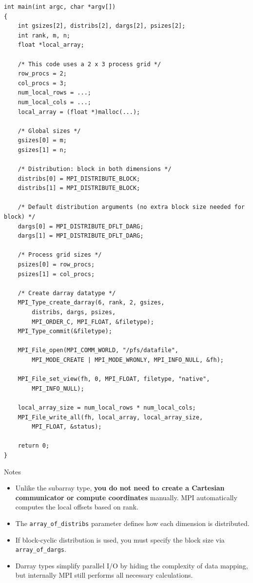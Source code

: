 \documentclass[12pt]{book}
\begin{document}
\begin{lstlisting}[style=cppstyle]
int main(int argc, char *argv[])
{
    int gsizes[2], distribs[2], dargs[2], psizes[2];
    int rank, m, n;
    float *local_array;

    /* This code uses a 2 x 3 process grid */
    row_procs = 2;
    col_procs = 3;
    num_local_rows = ...;
    num_local_cols = ...;
    local_array = (float *)malloc(...);

    /* Global sizes */
    gsizes[0] = m;
    gsizes[1] = n;

    /* Distribution: block in both dimensions */
    distribs[0] = MPI_DISTRIBUTE_BLOCK;
    distribs[1] = MPI_DISTRIBUTE_BLOCK;

    /* Default distribution arguments (no extra block size needed for block) */
    dargs[0] = MPI_DISTRIBUTE_DFLT_DARG;
    dargs[1] = MPI_DISTRIBUTE_DFLT_DARG;

    /* Process grid sizes */
    psizes[0] = row_procs;
    psizes[1] = col_procs;

    /* Create darray datatype */
    MPI_Type_create_darray(6, rank, 2, gsizes,
        distribs, dargs, psizes,
        MPI_ORDER_C, MPI_FLOAT, &filetype);
    MPI_Type_commit(&filetype);

    MPI_File_open(MPI_COMM_WORLD, "/pfs/datafile",
        MPI_MODE_CREATE | MPI_MODE_WRONLY, MPI_INFO_NULL, &fh);

    MPI_File_set_view(fh, 0, MPI_FLOAT, filetype, "native",
        MPI_INFO_NULL);

    local_array_size = num_local_rows * num_local_cols;
    MPI_File_write_all(fh, local_array, local_array_size,
        MPI_FLOAT, &status);

    return 0;
}
\end{lstlisting}
Notes
\begin{itemize}
    \item Unlike the subarray type, \textbf{you do not need to create a Cartesian communicator or compute coordinates} manually. MPI automatically computes the local offsets based on rank.
    \item The \texttt{array\_of\_distribs} parameter defines how each dimension is distributed.
    \item If block-cyclic distribution is used, you must specify the block size via \texttt{array\_of\_dargs}.
    \item Darray types simplify parallel I/O by hiding the complexity of data mapping, but internally MPI still performs all necessary calculations.
\end{itemize}
\end{document}
